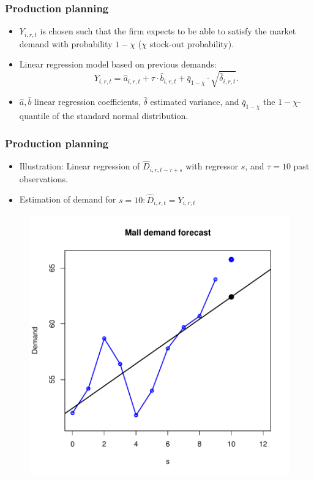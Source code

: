 \documentclass{beamer}
\begin{document}
\frame
{
  \frametitle{Production planning} 
\begin{itemize}
	
	
	\item $Y_{i,r,t}$ is chosen such that the firm expects to be able to satisfy the market demand with probability $1-\chi$ ($\chi$ stock-out probability).
	
	\item Linear regression model based on previous demands:
	\[
			Y_{i,r,t}= \hat{a}_{i,r,t}+\tau \cdot \hat{b}_{i,r,t}+\bar{q}_{1-\chi}\cdot \sqrt{\hat{\delta}_{i,r,t}}.
	\]
	
	\item $\hat{a}, \hat{b}$ linear regression coefficients, $\hat{\delta}$ estimated variance, and $\bar{q}_{1-\chi}$ the $1-\chi$-quantile of the standard normal distribution. 
	\end{itemize}


}

\frame
{
 \frametitle{Production planning}
 
\begin{itemize}
	\item  Illustration: Linear regression of  $\hat{D}_{i,r,t-\tau+ s}$ with regressor $s$, and $\tau=10$ past observations. 
	\item Estimation of demand for $s=10:  \hat{D}_{i,r,t}=Y_{i,r,t}$ 
\end{itemize}
   
\begin{figure}
\centering
\includegraphics[scale=0.3]{regression.pdf}
\label{fig:regression}
\end{figure}



}
\end{document}
